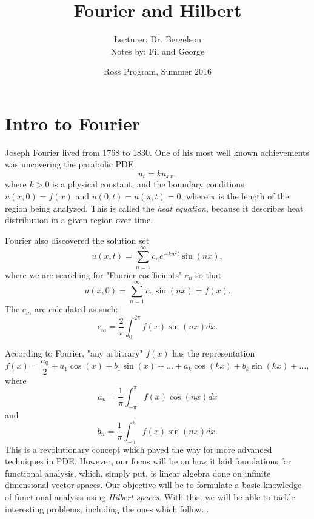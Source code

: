 \documentclass{article}
\title{Fourier and Hilbert}
\author{Lecturer: Dr. Bergelson \\
Notes by: Fil and George}
\date{Ross Program, Summer 2016}
\begin{document}
\maketitle

\section{Intro to Fourier}

Joseph Fourier lived from 1768 to 1830. One of his most well known achievements was uncovering the parabolic PDE 
\begin{equation}
    u_{t} = ku_{xx},
\end{equation}
where $k>0$ is a physical constant, and the boundary conditions $u(x,0) = f(x)$ and $u(0,t) = u(\pi, t) = 0$, where $\pi$ is the length of the region being analyzed. This is called the \textit{heat equation}, because it describes heat distribution in a given region over time.

Fourier also discovered the solution set
\begin{equation}
    u(x,t) = \sum_{n=1}^{\infty} c_{n} e^{-kn^{2}t}\sin(nx),
\end{equation}
where we are searching for "Fourier coefficients" $c_{n}$ so that 
\begin{equation}
u(x,0) = \sum_{n=1}^{\infty} c_{n}\sin(nx) = f(x).
\end{equation}
The $c_{m}$ are calculated as such:
\begin{equation}
c_{m} = \frac{2}{\pi} \int_{0}^{2\pi} f(x)\sin(nx) dx.
\end{equation}

According to Fourier, "any arbitrary" $f(x)$ has the representation 
\begin{equation}
f(x) = \frac{a_{0}}{2} + a_{1}\cos(x) + b_{1}\sin(x) + \ldots + a_{k}\cos(kx) + b_{k}\sin(kx) + \ldots ,
\end{equation}
where 
\begin{equation}
a_{n} = \frac{1}{\pi} \int_{-\pi}^{\pi} f(x)\cos(nx) dx
\end{equation}
and
\begin{equation}
b_{n} = \frac{1}{\pi} \int_{-\pi}^{\pi} f(x)\sin(nx) dx.
\end{equation}
This is a revolutionary concept which paved the way for more advanced techniques in PDE. However, our focus will be on how it laid foundations for functional analysis, which, simply put, is linear algebra done on infinite dimensional vector spaces. Our objective will be to formulate a basic knowledge of functional analysis using \textit{Hilbert spaces}. With this, we will be able to tackle interesting problems, including the ones which follow...
\end{document}
